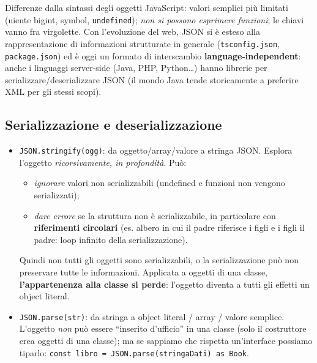 Differenze dalla sintassi degli oggetti JavaScript: valori semplici pi\`u limitati (niente
bigint, symbol, \texttt{undefined}); \emph{non si possono esprimere funzioni}; le chiavi
vanno fra virgolette. Con l'evoluzione del web, JSON si \`e esteso alla rappresentazione di
informazioni strutturate in generale (\texttt{tsconfig.json}, \texttt{package.json}) ed \`e
oggi un formato di interscambio \textbf{language-independent}: anche i linguaggi server-side
(Java, PHP, Python\dots) hanno librerie per serializzare/deserializzare JSON (il mondo Java
tende storicamente a preferire XML per gli stessi scopi).

\subsection{Serializzazione e deserializzazione}
\begin{itemize}
  \item \texttt{JSON.stringify(ogg)}: da oggetto/array/valore a stringa JSON. Esplora
        l'oggetto \emph{ricorsivamente, in profondit\`a}. Pu\`o:
        \begin{itemize}
          \item \emph{ignorare} valori non serializzabili (undefined e funzioni non vengono
                serializzati);
          \item \emph{dare errore} se la struttura non \`e serializzabile, in particolare con
                \textbf{riferimenti circolari} (es. albero in cui il padre riferisce i figli
                e i figli il padre: loop infinito della serializzazione).
        \end{itemize}
        Quindi non tutti gli oggetti sono serializzabili, o la serializzazione pu\`o non
        preservare tutte le informazioni. Applicata a oggetti di una classe,
        \textbf{l'appartenenza alla classe si perde}: l'oggetto diventa a tutti gli effetti
        un object literal.
  \item \texttt{JSON.parse(str)}: da stringa a object literal / array / valore semplice.
        L'oggetto \emph{non} pu\`o essere ``inserito d'ufficio'' in una classe (solo il
        costruttore crea oggetti di una classe); ma se sappiamo che rispetta un'interface
        possiamo tiparlo:
        \texttt{const libro = JSON.parse(stringaDati) as Book}.
\end{itemize}

